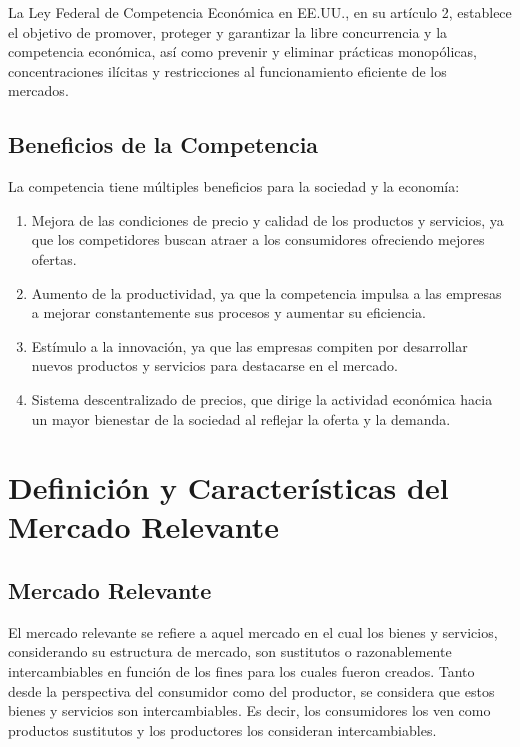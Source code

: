 \documentclass[
  doc,
  floatsintext,
  longtable,
  a4paper,
  nolmodern,
  notxfonts,
  notimes,
  12pt,
  colorlinks=true,linkcolor=blue,citecolor=blue,urlcolor=blue]{apa7}
\providecommand{\tightlist}{%
  \setlength{\itemsep}{0pt}\setlength{\parskip}{0pt}}
\begin{document}
La Ley Federal de Competencia Económica en EE.UU., en su artículo 2,
establece el objetivo de promover, proteger y garantizar la libre
concurrencia y la competencia económica, así como prevenir y eliminar
prácticas monopólicas, concentraciones ilícitas y restricciones al
funcionamiento eficiente de los mercados.

\subsection{Beneficios de la
Competencia}\label{beneficios-de-la-competencia}

La competencia tiene múltiples beneficios para la sociedad y la
economía:

\begin{enumerate}
\def\labelenumi{\arabic{enumi}.}
\tightlist
\item
  Mejora de las condiciones de precio y calidad de los productos y
  servicios, ya que los competidores buscan atraer a los consumidores
  ofreciendo mejores ofertas.
\item
  Aumento de la productividad, ya que la competencia impulsa a las
  empresas a mejorar constantemente sus procesos y aumentar su
  eficiencia.
\item
  Estímulo a la innovación, ya que las empresas compiten por desarrollar
  nuevos productos y servicios para destacarse en el mercado.
\item
  Sistema descentralizado de precios, que dirige la actividad económica
  hacia un mayor bienestar de la sociedad al reflejar la oferta y la
  demanda.
\end{enumerate}

\section{Definición y Características del Mercado
Relevante}\label{definiciuxf3n-y-caracteruxedsticas-del-mercado-relevante}

\subsection{Mercado Relevante}\label{mercado-relevante}

El mercado relevante se refiere a aquel mercado en el cual los bienes y
servicios, considerando su estructura de mercado, son sustitutos o
razonablemente intercambiables en función de los fines para los cuales
fueron creados. Tanto desde la perspectiva del consumidor como del
productor, se considera que estos bienes y servicios son
intercambiables. Es decir, los consumidores los ven como productos
sustitutos y los productores los consideran intercambiables.
\end{document}
